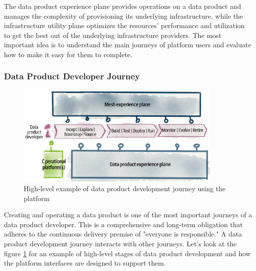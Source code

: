 \documentclass[12pt, a4paper]{book}
\begin{document}
The data product experience plane provides operations on a data product and manages the complexity of provisioning its underlying infrastructure, while the infrastructure utility plane optimizes the resources' performance and utilization to get the best out of the underlying infrastructure providers. The most important idea is to understand the main journeys of platform users and evaluate how to make it easy for them to complete.
\vspace{-.3cm}
\subsubsection*{Data Product Developer Journey}
\begin{figure}[ht]
	\begin{framed}
		\centering
		\includegraphics[width=10cm]{DataProductDevJourney.png}
		\caption{High-level example of data product development journey using the platform}
		\label{DataProductDevJourney}
	\end{framed}
\end{figure}

Creating and operating a data product is one of the most important journeys of a data product developer. This is a comprehensive and long-term obligation that adheres to the continuous delivery premise of "everyone is responsible." A data product development journey interacts with other journeys. Let’s look at the figure \ref{DataProductDevJourney} for an example of high-level stages of data product development and how the platform interfaces are designed to support them.
\end{document}
